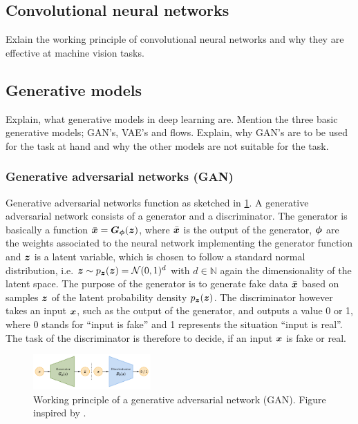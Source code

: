 \documentclass[a4paper,10pt, twocolumn]{article}
\begin{document}
\subsection{Convolutional neural networks}
Exlain the working principle of convolutional neural networks and why they are effective at machine vision tasks.

\subsection{Generative models}
Explain, what generative models in deep learning are. Mention the three basic generative models; GAN's, VAE's and flows. Explain, why GAN's are to be used for the task at hand and why the other models are not suitable for the task.

\subsubsection{Generative adversarial networks (GAN)}
Generative adversarial networks function as sketched in \cref{fig:GAN}. A generative adversarial network consists of a generator and a discriminator. The generator is basically a function $\bar{\bm{x}} = \bm{G}_{\bm{\phi}}(\bm{z})$, where $\bar{\bm{x}}$ is the output of the generator, $\bm{\phi}$ are the weights associated to the neural network implementing the generator function and $\bm{z}$ is a latent variable, which is chosen to follow a standard normal distribution, i.e. $\bm{z} \sim p_{\bm{z}}(\bm{z}) = \mathcal{N}(0,1)^d$ with $d \in \mathbb{N}$ again the dimensionality of the latent space. The purpose of the generator is to generate fake data $\bar{\bm{x}}$ based on samples $\bm{z}$ of the latent probability density $p_{\bm{z}}(\bm{z})$. The discriminator however takes an input $\bm{x}$, such as the output of the generator, and outputs a value 0 or 1, where 0 stands for ``input is fake'' and 1 represents the situation ``input is real''. The task of the discriminator is therefore to decide, if an input $\bm{x}$ is fake or real.
\begin{figure}[h!]
	\centering
	\includegraphics[width=0.4\textwidth]{figures/GAN.pdf}
	\caption{Working principle of a generative adversarial network (GAN). Figure inspired by \cite{weng2018flow}.}
	\label{fig:GAN}
\end{figure}
\end{document}
